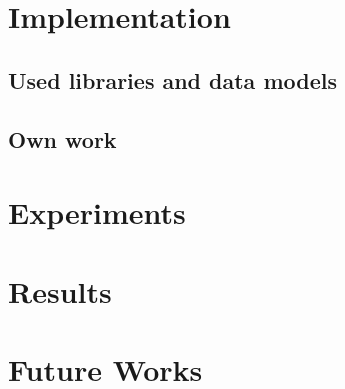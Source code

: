 \documentclass[10pt,a4paper,twocolumn]{article}
\begin{document}
\section{Implementation}

\subsection{Used libraries and data models}


\subsection{Own work}



\section{Experiments}




\section{Results}




\section{Future Works}
\end{document}
